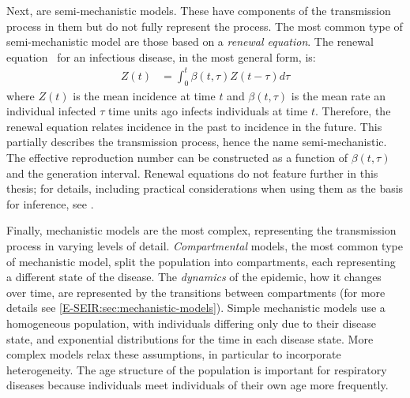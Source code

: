 \documentclass[thesis.tex]{subfiles}
\begin{document}
Next, are semi-mechanistic models.
These have components of the transmission process in them but do not fully represent the process.
The most common type of semi-mechanistic model are those based on a \emph{renewal equation}.
The renewal equation~\autocite{fraserRenewal} for an infectious disease, in the most general form, is:
\begin{align}
    Z(t) &= \int_{0}^{t} \beta(t,\tau) Z(t-\tau) d \tau
\end{align}
where $Z(t)$ is the mean incidence at time $t$ and $\beta(t, \tau)$ is the mean rate an individual infected $\tau$ time units ago infects individuals at time $t$.
Therefore, the renewal equation relates incidence in the past to incidence in the future.
This partially describes the transmission process, hence the name semi-mechanistic.
The effective reproduction number can be constructed as a function of $\beta(t, \tau)$ and the generation interval.
Renewal equations do not feature further in this thesis; for details, including practical considerations when using them as the basis for inference, see \textcite{nashEstimating,gosticPractical}.

Finally, mechanistic models are the most complex, representing the transmission process in varying levels of detail.
\emph{Compartmental} models, the most common type of mechanistic model, split the population into compartments, each representing a different state of the disease.
The \emph{dynamics} of the epidemic, how it changes over time, are represented by the transitions between compartments (for more details see \cref{E-SEIR:sec:mechanistic-models}).
Simple mechanistic models use a homogeneous population, with individuals differing only due to their disease state, and exponential distributions for the time in each disease state.
More complex models relax these assumptions, in particular to incorporate heterogeneity.
The age structure of the population is important for respiratory diseases because individuals meet individuals of their own age more frequently.
\end{document}
